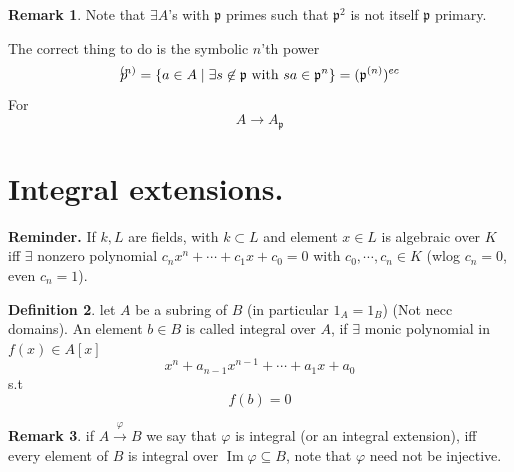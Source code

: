 \documentclass[11pt,a4paper]{article}
\theoremstyle{definition}
\newtheorem{definition}{Definition}[section]
\newtheorem{remark}[definition]{Remark}
\theoremstyle{plain}
\theoremstyle{remark}
\renewcommand{\set}[1]{\left\{ #1 \right\}}
\begin{document}
\begin{remark}
    Note that $\exists A$'s with $\mathfrak{p}$ primes such that $\mathfrak{p}^2$ is not itself $\mathfrak{p}$ primary.

    The correct thing to do is the symbolic $n$'th power 
    $$\mathrlap{p}^{(n)} = \set{a \in A \mid \exists s \not\in \mathfrak{p} \text{ with } sa \in \mathfrak{p}^n} = (\mathfrak{p}^{(n)})^{ec}$$
    For 
    $$A \to A_\mathfrak{p}$$
\end{remark}

\section{Integral extensions.} 
\textbf{Reminder.} If $k, L$ are fields, with $k \subset L$ and element $x \in L$ is algebraic over $K$ iff 
$\exists$ nonzero polynomial $c_n x^n + \cdots+ c_1 x + c_0 = 0$ with $c_0, \cdots, c_n \in K$ (wlog $c_n = 0$, even $c_n = 1$). 

\begin{definition}
    let $A$ be a subring of $B$ (in particular $1_A = 1_B$) (Not necc domains). An element $b \in B$ is called integral over $A$, 
    if $\exists$ monic polynomial in $f(x) \in A[x]$ 
    $$x^n + a_{n-1} x^{n-1} + \cdots + a_1 x + a_0$$
    s.t 
    $$f(b) = 0$$
\end{definition}

\begin{remark}
    if $A \xrightarrow{\varphi} B$ we say that $\varphi$ is integral (or an integral extension), iff every element of $B$ is 
    integral over $\operatorname{Im} \varphi \subseteq B$, note that 
    $\varphi$ need not be injective.
\end{remark}
\end{document}
